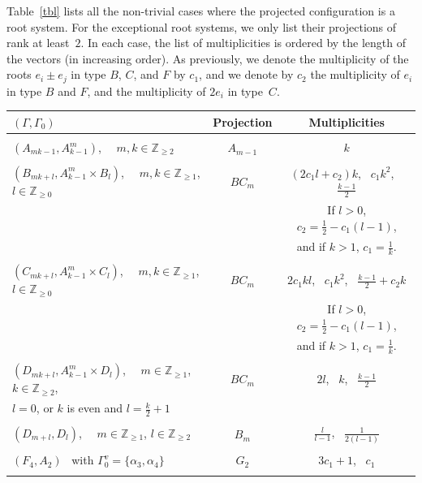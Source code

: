 \documentclass[12pt]{amsart}
\newcommand{\Z}{\mathbb Z}
\numberwithin{equation}{section}
\theoremstyle{definition}
\begin{document}
Table~\ref{tbl} lists all the non-trivial cases where the projected configuration is a root system. For the exceptional root systems, we only list their projections of rank at least~$2$. 
In each case, the list of multiplicities is ordered by the length of the vectors (in increasing order).
As previously, we denote the multiplicity of the roots $e_i \pm e_j$ in type $B$, $C$, and $F$ by $c_1$, and we denote by $c_2$ the multiplicity of $e_i$ in type $B$ and $F$, and the multiplicity of $2e_i$ in type~$C$. 


\begin{center}
\begin{table}
    \begin{longtable}[c]{|l | c | c|} 
         \hline
         $(\Gamma, \Gamma_0)$ & Projection & Multiplicities  \\ 
         \hline & & \\
         $(A_{mk-1}, A_{k-1}^m)$, \ \ $m, k \in \Z_{\geq 2}$ & $A_{m-1}$ & $k$  \\ & & \\
         $(B_{mk+l}, A_{k-1}^m\times B_l)$, \ \ $m, k \in \Z_{\geq 1}$, $l \in \Z_{\geq 0}$ & $BC_m$ & $(2c_1 l + c_2) k$, \ $c_1k^2$, \ $\frac{k-1}{2}$  \\ 
         & & If $l>0$, $c_2 = \frac{1}{2} - c_1(l - 1)$, \\
         & & and if $k>1$, $c_1 = \frac1k$.  \\ & & \\
         $(C_{mk+l}, A_{k-1}^m \times C_l)$, \ \ $m, k \in \Z_{\geq 1}$, $l \in \Z_{\geq 0}$ & $BC_m$ & $2c_1 kl$, \ $c_1k^2$, \ $\frac{k-1}{2} + c_2k$ \\ 
         & & If $l>0$, $c_2 = \frac{1}{2} - c_1(l - 1)$, \\
         & & and if $k>1$, $c_1 = \frac1k$.  \\ & & \\
         $(D_{mk+l}, A_{k-1}^m \times D_l)$, \ \ $m \in \Z_{\geq 1}$, $k \in \Z_{\geq 2}$,  & $BC_m$ & $2l$, \, $k$, \ $\frac{k-1}{2}$ \\
         \hspace{3.2em} $l=0$, or $k$ is even and $l=\frac{k}{2} + 1$  & &  \\ & & \\
         $(D_{m+l}, D_l)$, \ \ $m \in \Z_{\geq 1}$, $l \in \Z_{\geq 2}$ & $B_m$ & $\frac{l}{l-1}$, \ $\frac{1}{2(l-1)}$   \\ & & \\
         $(F_4, A_2)$ \ with $\Gamma_0^v = \{\alpha_3, \alpha_4 \}$ & $G_2$ & $3c_1 + 1$, \ $c_1$ \\ & & \\

\end{longtable}
\end{table}
\end{center}
\end{document}
